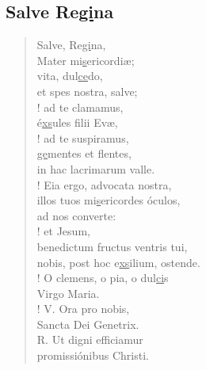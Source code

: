 \subsection*{Salve Re\ul{gi}na}
\vspace{-0.5em}

\begin{verse}
        Salve, Re\ul{gi}na,
\\      Mater mi\ul{s}ericordiæ;
\\      vita, dul\ul{ce}do,
\\\vin      et spes nostra, salve;
%
\\!     ad te clamamus,
\\      \'e\ul{xs}ules filii Evæ,
%
\\!     ad te suspiramus,
\\      \ul{ge}mentes et flentes,
\\      in hac lacrimarum valle.
%
\\!     Eia ergo, advocata nostra,
\\      illos tuos mi\ul{s}ericordes \'oculos,
\\      ad nos converte:
%
\\!     et Jesum,
\\      benedictum fructus ventris tui,
\\      nobis, post hoc e\ul{xs}ilium, ostende.
%
\\!     O clemens, o pia, o dul\ul{ci}s
\\      Virgo Maria.
%
\\!     V. Ora pro nobis,
\\\vin      Sancta Dei Genetrix.
\\      R. Ut digni efficiamur
\\\vin      promissi\'onibus Christi.
\end{verse}